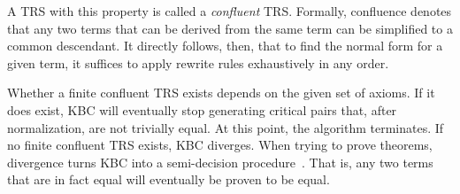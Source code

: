 A TRS with this property is called a \emph{confluent} TRS. Formally, confluence denotes that any two terms that can be derived from the same term can be simplified to a common descendant. It directly follows, then, that to find the normal form for a given term, it suffices to apply rewrite rules exhaustively in any order.

Whether a finite confluent TRS exists depends on the given set of axioms. If it does exist, KBC will eventually stop generating critical pairs that, after normalization, are not trivially equal. At this point, the algorithm terminates. If no finite confluent TRS exists, KBC diverges. When trying to prove theorems, divergence turns KBC into a semi-decision procedure~\citep{10.1093/comjnl/34.1.2}. That is, any two terms that are in fact equal will eventually be proven to be equal.